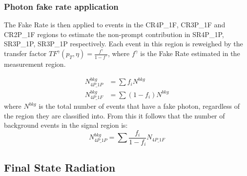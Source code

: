 \subsubsection{Photon fake rate application}
The Fake Rate is then applied to events in the CR4P\_1F, CR3P\_1F and CR2P\_1F regions to estimate the non-prompt contribution in SR4P\_1P, SR3P\_1P, SR3P\_1P respectively.
Each event in this region is reweighed by the transfer factor $TF^\gamma(p_T, \eta) = \frac{f^\gamma}{1-f^\gamma}$, where $f^\gamma$ is the Fake Rate estimated in the measurement region.


\begin{equation}
  \begin{split}
    \label{eq:fakeRate_explanation_part1}
    N^{bkg}_{4P\_1P} &= \sum f_i N^{bkg}
    \\
    N^{bkg}_{4P\_1F} &= \sum ( 1-f_i ) N^{bkg}
  \end{split}
\end{equation}
where $N^{bkg}$ is the total number of events that have a fake photon, regardless of the region they are classified into.
From this it follows that the number of background events in the signal region is:
\begin{equation}
  N^{bkg}_{4P\_1P} = \sum \frac{f_i}{1-f_i} N_{4P\_1F}
\end{equation}

\subsection{Final State Radiation}
